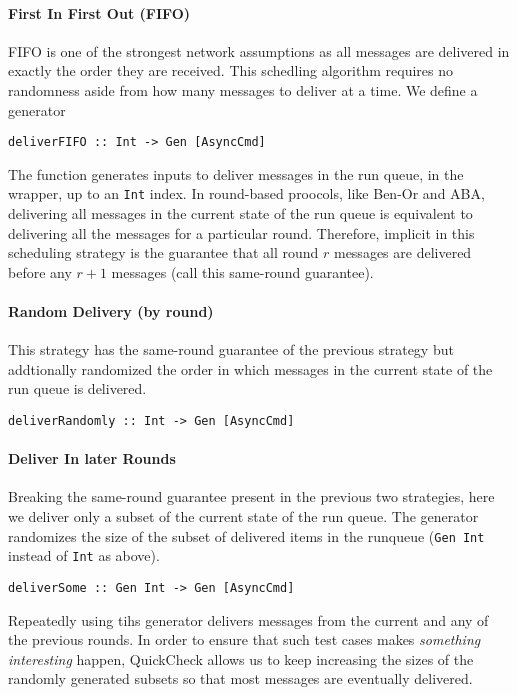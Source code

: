 \paragraph{First In First Out (FIFO)}
FIFO is one of the strongest network assumptions as all messages are delivered in exactly the order they are received. 
This schedling algorithm requires no randomness aside from how many messages to deliver at a time.
We define a generator 
\begin{lstlisting}
deliverFIFO :: Int -> Gen [AsyncCmd]
\end{lstlisting}
The function generates inputs to deliver messages in the run queue, in the wrapper, up to an \texttt{Int} index. 
In round-based proocols, like Ben-Or and ABA, delivering all messages in the current state of the run queue is equivalent to delivering
all the messages for a particular round. 
Therefore, implicit in this scheduling strategy is the guarantee that all round $r$ messages are delivered before any $r+1$ messages (call this same-round guarantee).

\paragraph{Random Delivery (by round)}
This strategy has the same-round guarantee of the previous strategy but addtionally randomized the order
in which messages in the current state of the run queue is delivered.
\begin{lstlisting}
deliverRandomly :: Int -> Gen [AsyncCmd]
\end{lstlisting}

\paragraph{Deliver In later Rounds}
Breaking the same-round guarantee present in the previous two strategies, here we deliver only a subset of the current state of the run queue.
The generator randomizes the size of the subset of delivered items in the runqueue (\texttt{Gen Int} instead of \texttt{Int} as above).
\begin{lstlisting}
deliverSome :: Gen Int -> Gen [AsyncCmd]
\end{lstlisting}
Repeatedly using tihs generator delivers messages from the current and any of the previous rounds. 
In order to ensure that such test cases makes \emph{something interesting} happen, QuickCheck allows us to keep increasing the sizes of the randomly generated subsets so that
most messages are eventually delivered. 

